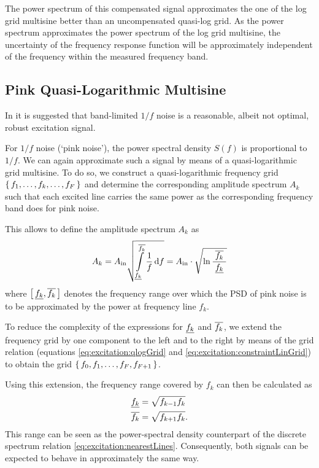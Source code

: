   The power spectrum of this compensated signal approximates the one of the log grid multisine better than an uncompensated quasi-log grid.
  As the power spectrum approximates the power spectrum of the log grid multisine, the uncertainty of the frequency response function will be approximately independent of the frequency within the measured frequency band.

  \subsection{Pink Quasi-Logarithmic Multisine}
  In \citep{Rojas2007} it is suggested that band-limited $1/f$ noise is a reasonable, albeit not optimal, robust excitation signal.

  For $1/f$ noise (`pink noise'), the power spectral density $S(f)$ is proportional to $1/f$.
  We can again approximate such a signal by means of a quasi-logarithmic grid multisine.
  To do so, we construct a quasi-logarithmic frequency grid $\set{f_1,\ldots,f_k,\ldots,f_F}$ and determine the corresponding amplitude spectrum $A_k$ such that each excited line carries the same power as the corresponding frequency band does for pink noise.

  This allows to define the amplitude spectrum $A_k$ as
  \begin{equation}
    A_k = A_{\mathrm{in}}
                 \sqrt{\int_{\underline{f_{k}}}
                     ^{\overline{f_{k}}}
                     \limits
                     \frac{1}
                          {f}
                     \,\mathrm{d}{f}}
          = A_{\mathrm{in}}
                \cdot
                \sqrt{
                \ln \frac{\;\overline{f_{k}}\;}{\underline{f_{k}}}
                }
    \label{eq:excitation:pinkMS:Ak}
  \end{equation}
  where $\left[ \,\underline{f_{k}}, \overline{f_{k}}\, \right] $ denotes the frequency range over which the \gls{PSD} of pink noise is to be approximated by the power at frequency line $f_k$.

  To reduce the complexity of the expressions for $\underline{f_{k}}$ and $\overline{f_{k}}$, we extend the frequency grid by one component to the left and to the right by means of the grid relation (equations \eqref{eq:excitation:qlogGrid} and \eqref{eq:excitation:constraintLinGrid}) to obtain the grid $\set{f_0, f_1, \ldots, f_F, f_{F+1}}$.

  Using this extension, the frequency range covered by $f_k$ can then be calculated as
    \begin{align}
      \underline{f_{k}} &= \sqrt{f_{k-1} f_k}\\
      \overline{f_{k}} &= \sqrt{f_{k+1} f_k}
    \label{eq:excitation:fRange}
    \text{.}
    \end{align}
  This range can be seen as the power-spectral density counterpart of the discrete spectrum relation \eqref{eq:excitation:nearestLines}.
  Consequently, both signals can be expected to behave in approximately the same way.

